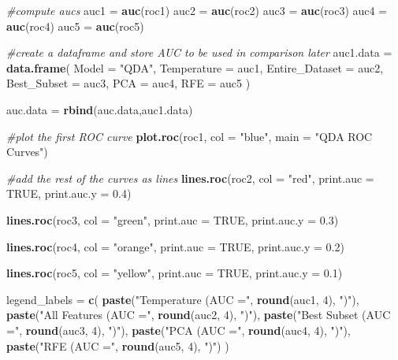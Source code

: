 \documentclass[
]{article}
\newenvironment{Shaded}{\begin{snugshade}}{\end{snugshade}}
\newcommand{\AttributeTok}[1]{\textcolor[rgb]{0.13,0.29,0.53}{#1}}
\newcommand{\CommentTok}[1]{\textcolor[rgb]{0.56,0.35,0.01}{\textit{#1}}}
\newcommand{\ConstantTok}[1]{\textcolor[rgb]{0.56,0.35,0.01}{#1}}
\newcommand{\DecValTok}[1]{\textcolor[rgb]{0.00,0.00,0.81}{#1}}
\newcommand{\FloatTok}[1]{\textcolor[rgb]{0.00,0.00,0.81}{#1}}
\newcommand{\FunctionTok}[1]{\textcolor[rgb]{0.13,0.29,0.53}{\textbf{#1}}}
\newcommand{\NormalTok}[1]{#1}
\newcommand{\OtherTok}[1]{\textcolor[rgb]{0.56,0.35,0.01}{#1}}
\newcommand{\StringTok}[1]{\textcolor[rgb]{0.31,0.60,0.02}{#1}}
\begin{document}
\begin{Shaded}
\begin{Highlighting}[]
\CommentTok{\#compute aucs}
\NormalTok{auc1 }\OtherTok{=} \FunctionTok{auc}\NormalTok{(roc1)}
\NormalTok{auc2 }\OtherTok{=} \FunctionTok{auc}\NormalTok{(roc2)}
\NormalTok{auc3 }\OtherTok{=} \FunctionTok{auc}\NormalTok{(roc3)}
\NormalTok{auc4 }\OtherTok{=} \FunctionTok{auc}\NormalTok{(roc4)}
\NormalTok{auc5 }\OtherTok{=} \FunctionTok{auc}\NormalTok{(roc5)}

\CommentTok{\#create a dataframe and store AUC to be used in comparison later}
\NormalTok{auc1.data }\OtherTok{=} \FunctionTok{data.frame}\NormalTok{(}
  \AttributeTok{Model =} \StringTok{"QDA"}\NormalTok{,}
  \AttributeTok{Temperature =}\NormalTok{ auc1,}
  \AttributeTok{Entire\_Dataset =}\NormalTok{ auc2,}
  \AttributeTok{Best\_Subset =}\NormalTok{ auc3,}
  \AttributeTok{PCA =}\NormalTok{ auc4,}
  \AttributeTok{RFE =}\NormalTok{ auc5}
\NormalTok{)}

\NormalTok{auc.data }\OtherTok{=} \FunctionTok{rbind}\NormalTok{(auc.data,auc1.data)}

\CommentTok{\#plot the first ROC curve}
\FunctionTok{plot.roc}\NormalTok{(roc1, }\AttributeTok{col =} \StringTok{"blue"}\NormalTok{, }\AttributeTok{main =} \StringTok{"QDA ROC Curves"}\NormalTok{)}

\CommentTok{\#add the rest of the curves as lines}
\FunctionTok{lines.roc}\NormalTok{(roc2, }\AttributeTok{col =} \StringTok{"red"}\NormalTok{, }\AttributeTok{print.auc =} \ConstantTok{TRUE}\NormalTok{, }\AttributeTok{print.auc.y =} \FloatTok{0.4}\NormalTok{)}

\FunctionTok{lines.roc}\NormalTok{(roc3, }\AttributeTok{col =} \StringTok{"green"}\NormalTok{, }\AttributeTok{print.auc =} \ConstantTok{TRUE}\NormalTok{, }\AttributeTok{print.auc.y =} \FloatTok{0.3}\NormalTok{)}

\FunctionTok{lines.roc}\NormalTok{(roc4, }\AttributeTok{col =} \StringTok{"orange"}\NormalTok{, }\AttributeTok{print.auc =} \ConstantTok{TRUE}\NormalTok{, }\AttributeTok{print.auc.y =} \FloatTok{0.2}\NormalTok{)}

\FunctionTok{lines.roc}\NormalTok{(roc5, }\AttributeTok{col =} \StringTok{"yellow"}\NormalTok{, }\AttributeTok{print.auc =} \ConstantTok{TRUE}\NormalTok{, }\AttributeTok{print.auc.y =} \FloatTok{0.1}\NormalTok{)}

\NormalTok{legend\_labels }\OtherTok{=} \FunctionTok{c}\NormalTok{(}
  \FunctionTok{paste}\NormalTok{(}\StringTok{"Temperature (AUC ="}\NormalTok{, }\FunctionTok{round}\NormalTok{(auc1, }\DecValTok{4}\NormalTok{), }\StringTok{")"}\NormalTok{),}
  \FunctionTok{paste}\NormalTok{(}\StringTok{"All Features (AUC ="}\NormalTok{, }\FunctionTok{round}\NormalTok{(auc2, }\DecValTok{4}\NormalTok{), }\StringTok{")"}\NormalTok{),}
  \FunctionTok{paste}\NormalTok{(}\StringTok{"Best Subset (AUC ="}\NormalTok{, }\FunctionTok{round}\NormalTok{(auc3, }\DecValTok{4}\NormalTok{), }\StringTok{")"}\NormalTok{),}
  \FunctionTok{paste}\NormalTok{(}\StringTok{"PCA (AUC ="}\NormalTok{, }\FunctionTok{round}\NormalTok{(auc4, }\DecValTok{4}\NormalTok{), }\StringTok{")"}\NormalTok{),}
  \FunctionTok{paste}\NormalTok{(}\StringTok{"RFE (AUC ="}\NormalTok{, }\FunctionTok{round}\NormalTok{(auc5, }\DecValTok{4}\NormalTok{), }\StringTok{")"}\NormalTok{)}
\NormalTok{)}


\end{Highlighting}
\end{Shaded}
\end{document}
